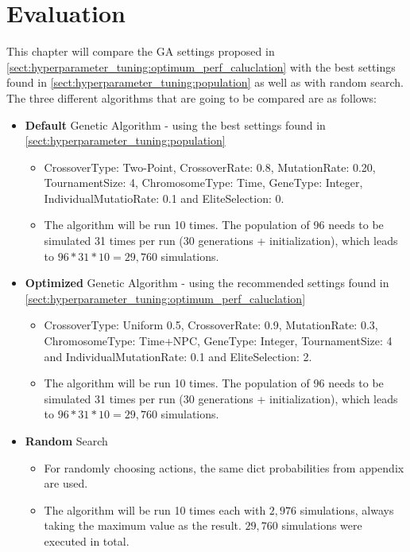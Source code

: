 \chapter{Evaluation}
\label{chap:evaluation}
This chapter will compare the GA settings proposed in \ref{sect:hyperparameter_tuning:optimum_perf_caluclation} with the best settings found in \ref{sect:hyperparameter_tuning:population} as well as with random search. The three different algorithms that are going to be compared are as follows:
\begin{itemize}
	\item \textbf{Default} Genetic Algorithm - using the best settings found in \ref{sect:hyperparameter_tuning:population}
	\begin{itemize}
		\item CrossoverType: Two-Point, CrossoverRate: 0.8, MutationRate: 0.20, TournamentSize: 4, ChromosomeType: Time, GeneType: Integer, IndividualMutatioRate: 0.1 and EliteSelection: 0. 
		\item The algorithm will be run 10 times. The population of 96 needs to be simulated 31 times per run (30 generations + initialization), which leads to $96 * 31 * 10 = 29,760$ simulations.
	\end{itemize}
	\item \textbf{Optimized} Genetic Algorithm - using the recommended settings found in \ref{sect:hyperparameter_tuning:optimum_perf_caluclation}
	\begin{itemize}
		\item CrossoverType: Uniform 0.5, CrossoverRate: 0.9, MutationRate: 0.3, ChromosomeType: Time+NPC, GeneType: Integer, TournamentSize: 4 and IndividualMutationRate: 0.1 and EliteSelection: 2. 
		\item The algorithm will be run 10 times. The population of 96 needs to be simulated 31 times per run (30 generations + initialization), which leads to $96 * 31 * 10 = 29,760$ simulations.
	\end{itemize}
	\item \textbf{Random} Search
	\begin{itemize}
		\item For randomly choosing actions, the same dict probabilities from  appendix are used. 
		\item The algorithm will be run 10 times each with $2,976$ simulations, always taking the maximum value as the result. $29,760$ simulations were executed in total.
	\end{itemize}
\end{itemize}


